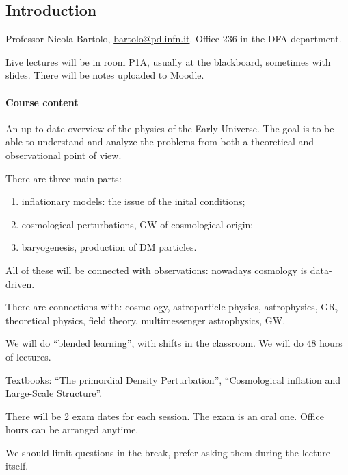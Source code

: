\documentclass[main.tex]{subfiles}
\begin{document}

\subsection*{Introduction}

Professor Nicola Bartolo, \url{bartolo@pd.infn.it}. 
Office 236 in the DFA department.

Live lectures will be in room P1A, usually at the blackboard, sometimes with slides.
There will be notes uploaded to Moodle.

\paragraph{Course content}

An up-to-date overview of the physics of the Early Universe.
The goal is to be able to understand and analyze the problems from both a theoretical and observational point of view. 

There are three main parts: 
\begin{enumerate}
    \item inflationary models: the issue of the inital conditions;
    \item cosmological perturbations, GW of cosmological origin;
    \item baryogenesis, production of DM particles.
\end{enumerate}

All of these will be connected with observations: nowadays cosmology is data-driven. 

There are connections with: cosmology, astroparticle physics, astrophysics, GR, theoretical physics, field theory, multimessenger astrophysics, GW. 

We will do ``blended learning'', with shifts in the classroom. 
We will do 48 hours of lectures. 

Textbooks: \textcite[]{lythPrimordialDensityPerturbation2009} ``The primordial Density Perturbation'', \cite[]{liddleCosmologicalInflationLargeScale2000} ``Cosmological inflation and Large-Scale Structure''.

There will be 2 exam dates for each session. The exam is an oral one. 
Office hours can be arranged anytime. 

We should limit questions in the break, prefer asking them during the lecture itself.
\end{document}
